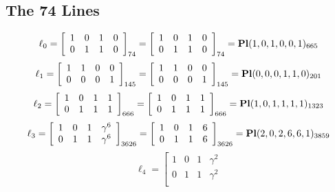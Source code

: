 \documentclass{article}
\begin{document}
{\subsection*{The 74 Lines}
$$
\ell_{0} = 
\left[
\begin{array}{*{4}{r}}
1 & 0 & 1 & 0\\
0 & 1 & 1 & 0\\
\end{array}
\right]
_{74}
=
\left[
\begin{array}{*{4}c}
1  & 0  & 1  & 0\\
0  & 1  & 1  & 0\\
\end{array}
\right]_{74}
={\rm\bf Pl}(1,0,1,0,0,1 )_{665}$$
$$
\ell_{1} = 
\left[
\begin{array}{*{4}{r}}
1 & 1 & 0 & 0\\
0 & 0 & 0 & 1\\
\end{array}
\right]
_{145}
=
\left[
\begin{array}{*{4}c}
1  & 1  & 0  & 0\\
0  & 0  & 0  & 1\\
\end{array}
\right]_{145}
={\rm\bf Pl}(0,0,0,1,1,0 )_{201}$$
$$
\ell_{2} = 
\left[
\begin{array}{*{4}{r}}
1 & 0 & 1 & 1\\
0 & 1 & 1 & 1\\
\end{array}
\right]
_{666}
=
\left[
\begin{array}{*{4}c}
1  & 0  & 1  & 1\\
0  & 1  & 1  & 1\\
\end{array}
\right]_{666}
={\rm\bf Pl}(1,0,1,1,1,1 )_{1323}$$
$$
\ell_{3} = 
\left[
\begin{array}{*{4}{r}}
1 & 0 & 1 & \gamma^{6}\\
0 & 1 & 1 & \gamma^{6}\\
\end{array}
\right]
_{3626}
=
\left[
\begin{array}{*{4}c}
1  & 0  & 1  & 6\\
0  & 1  & 1  & 6\\
\end{array}
\right]_{3626}
={\rm\bf Pl}(2,0,2,6,6,1 )_{3859}$$
$$
\ell_{4} = 
\left[
\begin{array}{*{4}{r}}
1 & 0 & 1 & \gamma^{2}\\
0 & 1 & 1 & \gamma^{2}\\

\end{array}$$}
\end{document}
